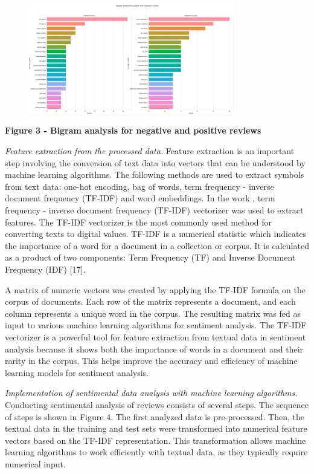 \begin{figure}[H]
	\centering
	\includegraphics[width=0.8\textwidth]{media/ict/image11}
	\caption*{}
\end{figure}


{\bfseries Figure 3 - Bigram analysis for negative and positive reviews}

\emph{Feature extraction from the processed data.} Feature extraction is
an important step involving the conversion of text data into vectors
that can be understood by machine learning algorithms. The following
methods are used to extract symbols from text data: one-hot encoding,
bag of words, term frequency - inverse document frequency (TF-IDF) and
word embeddings. In the work , term frequency - inverse document
frequency (TF-IDF) vectorizer was used to extract features. The TF-IDF
vectorizer is the most commonly used method for converting texts to
digital values. TF-IDF is a numerical statistic which indicates the
importance of a word for a document in a collection or corpus. It is
calculated as a product of two components: Term Frequency (TF) and
Inverse Document Frequency (IDF) {[}17{]}.

A matrix of numeric vectors was created by applying the TF-IDF formula
on the corpus of documents. Each row of the matrix represents a
document, and each column represents a unique word in the corpus. The
resulting matrix was fed as input to various machine learning algorithms
for sentiment analysis. The TF-IDF vectorizer is a powerful tool for
feature extraction from textual data in sentiment analysis because it
shows both the importance of words in a document and their rarity in the
corpus. This helps improve the accuracy and efficiency of machine
learning models for sentiment analysis.

\emph{Implementation of sentimental data analysis with machine learning
algorithms.} Conducting sentimental analysis of reviews consists of
several steps. The sequence of steps is shown in Figure 4. The first
analyzed data is pre-processed. Then, the textual data in the training
and test sets were transformed into numerical feature vectors based on
the TF-IDF representation. This transformation allows machine learning
algorithms to work efficiently with textual data, as they typically
require numerical input.

